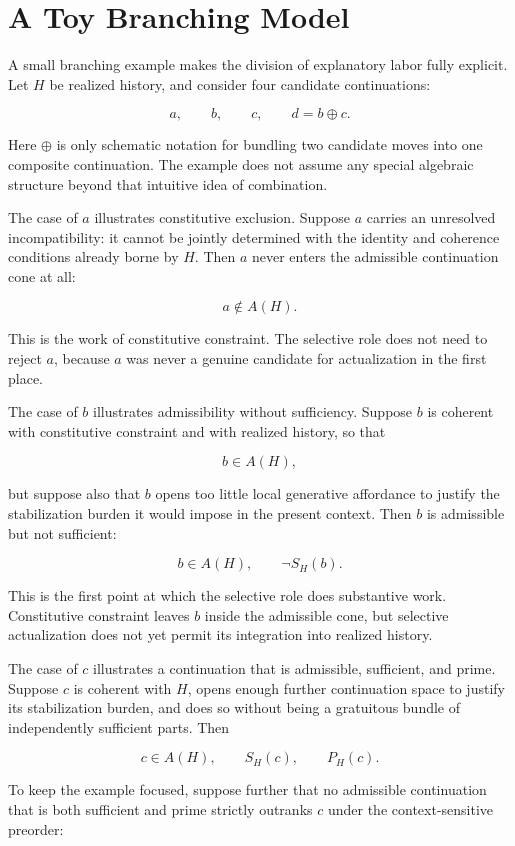 \documentclass[11pt]{article}
\theoremstyle{foundation}
\begin{document}
\section{A Toy Branching Model}

A small branching example makes the division of explanatory labor fully explicit. Let $H$ be realized history, and consider four candidate continuations:

\[
a, \qquad b, \qquad c, \qquad d = b \oplus c.
\]

Here $\oplus$ is only schematic notation for bundling two candidate moves into one composite continuation. The example does not assume any special algebraic structure beyond that intuitive idea of combination.

The case of $a$ illustrates constitutive exclusion. Suppose $a$ carries an unresolved incompatibility: it cannot be jointly determined with the identity and coherence conditions already borne by $H$. Then $a$ never enters the admissible continuation cone at all:

\[
a \notin A(H).
\]

This is the work of constitutive constraint. The selective role does not need to reject $a$, because $a$ was never a genuine candidate for actualization in the first place.

The case of $b$ illustrates admissibility without sufficiency. Suppose $b$ is coherent with constitutive constraint and with realized history, so that

\[
b \in A(H),
\]

but suppose also that $b$ opens too little local generative affordance to justify the stabilization burden it would impose in the present context. Then $b$ is admissible but not sufficient:

\[
b \in A(H), \qquad \neg S_H(b).
\]

This is the first point at which the selective role does substantive work. Constitutive constraint leaves $b$ inside the admissible cone, but selective actualization does not yet permit its integration into realized history.

The case of $c$ illustrates a continuation that is admissible, sufficient, and prime. Suppose $c$ is coherent with $H$, opens enough further continuation space to justify its stabilization burden, and does so without being a gratuitous bundle of independently sufficient parts. Then

\[
c \in A(H), \qquad S_H(c), \qquad P_H(c).
\]

To keep the example focused, suppose further that no admissible continuation that is both sufficient and prime strictly outranks $c$ under the context-sensitive preorder:
\end{document}
